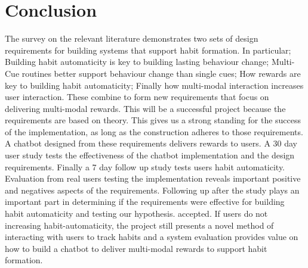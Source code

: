
\newpage
\section{Conclusion}

The survey on the relevant literature demonstrates two sets of design requirements for building systems that support habit formation. In particular; Building habit automaticity is key to building lasting behaviour change; Multi-Cue routines better support behaviour change than single cues; How rewards are key to building habit automaticity; Finally how multi-modal interaction increases user interaction. These combine to form new requirements that focus on delivering multi-modal rewards.\newline
\newline
This will be a successful project because the requirements are based on theory. This gives us a strong standing for the success of the implementation, as long as the construction adheres to those requirements.\newline
\newline
A chatbot designed from these requirements delivers rewards to users. A 30 day user study tests the effectiveness of the chatbot implementation and the design requirements. Finally a 7 day follow up study tests users habit automaticity.\newline
\newline
Evaluation from real users testing the implementation reveals important positive and negatives aspects of the requirements. Following up after the study plays an important part in determining if the requirements were effective for building habit automaticity and testing our hypothesis. accepted. If users do not increasing habit-automaticity, the project still presents a novel method of interacting with users to track habits and a system evaluation provides value on how to build a chatbot to deliver multi-modal rewards to support habit formation.
